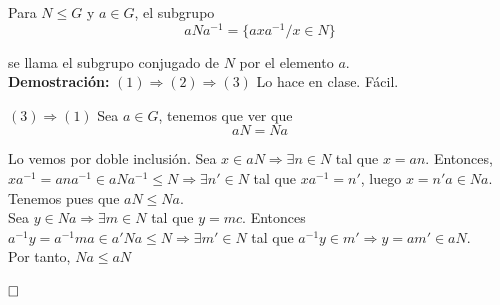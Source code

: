\documentclass{article}
\begin{document}
Para $N\leq G$ y $a\in G$, el subgrupo 
\begin{equation*}
aNa^{-1}=\{axa^{-1}/x\in N\}
\end{equation*}

se llama el subgrupo conjugado de $N$ por el elemento $a$. \\

\textbf{Demostración:} $(1)\Rightarrow (2)\Rightarrow (3)$ Lo hace en clase. Fácil. 

$(3)\Rightarrow (1)$ Sea $a\in G$, tenemos que ver que 
\begin{equation*}
aN=Na
\end{equation*}

Lo vemos por doble inclusión. Sea $x\in aN\Rightarrow \exists n\in N$ tal que $x=an$. Entonces, $xa^{-1}=ana^{-1} \in aNa^{-1} \leq N \Rightarrow \exists n'\in N$ tal que $xa^{-1}=n'$, luego $x=n'a\in Na$. \\

Tenemos pues que $aN\leq Na$. \\

Sea $y\in Na\Rightarrow \exists m \in N$ tal que  $y=mc$. Entonces $a^{-1}y=a^{-1}ma \in a'Na\leq N \Rightarrow \exists m'\in N$ tal que $a^{-1}y\in m' \Rightarrow y=am'\in aN$. \\

Por tanto, $Na\leq aN$

$\hfill\square$ \\
\end{document}
